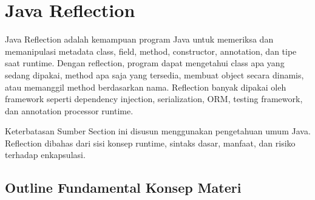 \section{Java Reflection}

Java Reflection adalah kemampuan program Java untuk memeriksa dan memanipulasi metadata class, field, method, constructor, annotation, dan tipe saat runtime. Dengan reflection, program dapat mengetahui class apa yang sedang dipakai, method apa saja yang tersedia, membuat object secara dinamis, atau memanggil method berdasarkan nama. Reflection banyak dipakai oleh framework seperti dependency injection, serialization, ORM, testing framework, dan annotation processor runtime.

\begin{cmt}{Keterbatasan Sumber}{}
Section ini disusun menggunakan pengetahuan umum Java. Reflection dibahas dari sisi konsep runtime, sintaks dasar, manfaat, dan risiko terhadap enkapsulasi.
\end{cmt}

\subsection{Outline Fundamental Konsep Materi}


